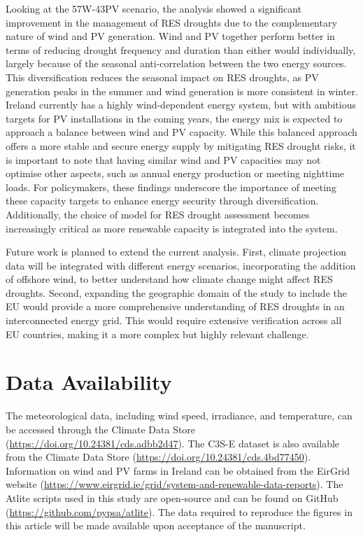\documentclass[preprint, 12pt, authoryear]{elsarticle}
\begin{document}
Looking at the 57W-43PV scenario, the analysis showed a significant improvement in the management of RES droughts due to the complementary nature of wind and PV generation. Wind and PV together perform better in terms of reducing drought frequency and duration than either would individually, largely because of the seasonal anti-correlation between the two energy sources. This diversification reduces the seasonal impact on RES droughts, as PV generation peaks in the summer and wind generation is more consistent in winter. Ireland currently has a highly wind-dependent energy system, but with ambitious targets for PV installations in the coming years, the energy mix is expected to approach a balance between wind and PV capacity. While this balanced approach offers a more stable and secure energy supply by mitigating RES drought risks, it is important to note that having similar wind and PV capacities may not optimise other aspects, such as annual energy production or meeting nighttime loads. For policymakers, these findings underscore the importance of meeting these capacity targets to enhance energy security through diversification. Additionally, the choice of model for RES drought assessment becomes increasingly critical as more renewable capacity is integrated into the system.

Future work is planned to extend the current analysis. First, climate projection data will be integrated with different energy scenarios, incorporating the addition of offshore wind, to better understand how climate change might affect RES droughts. Second, expanding the geographic domain of the study to include the EU would provide a more comprehensive understanding of RES droughts in an interconnected energy grid. This would require extensive verification across all EU countries, making it a more complex but highly relevant challenge.

\section*{Data Availability}

The meteorological data, including wind speed, irradiance, and temperature, can be accessed through the Climate Data Store (\url{https://doi.org/10.24381/cds.adbb2d47}). The C3S-E dataset is also available from the Climate Data Store (\url{https://doi.org/10.24381/cds.4bd77450}). Information on wind and PV farms in Ireland can be obtained from the EirGrid website (\url{https://www.eirgrid.ie/grid/system-and-renewable-data-reports}). The Atlite scripts used in this study are open-source and can be found on GitHub (\url{https://github.com/pypsa/atlite}). The data required to reproduce the figures in this article will be made available upon acceptance of the manuscript.




\end{document}
